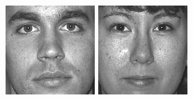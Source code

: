 \begin{figure}[ht]
\begin{center}
  \includegraphics[width=\columnwidth/10]{ch5/figures/feret25.jpg}
  \includegraphics[width=\columnwidth/10]{ch5/figures/feret26.jpg}

\end{center}
\end{figure}
